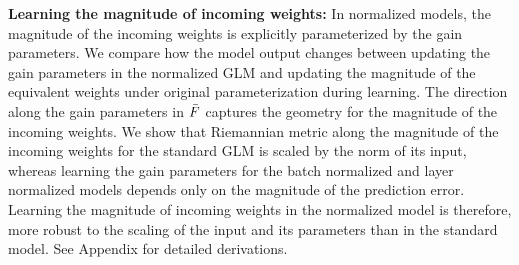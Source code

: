 \documentclass{article}
\begin{document}
{\textbf{Learning the magnitude of incoming weights:}}
In normalized models, the magnitude of the incoming weights is explicitly parameterized by the gain parameters. We compare how the model output changes between updating the gain parameters in the normalized GLM and updating the magnitude of the equivalent weights under original parameterization during learning. The direction along the gain parameters in $\bar{{F}}$ captures the geometry for the magnitude of the incoming weights.  We show that Riemannian metric along the magnitude of the incoming weights for the standard GLM is scaled by the norm of its input, whereas learning the gain parameters for the batch normalized and layer normalized models depends only on the magnitude of the prediction error.  Learning the magnitude of incoming weights in the normalized model is therefore, more robust to the scaling of the input and its parameters than in the standard model. See Appendix for detailed derivations. 
\end{document}
